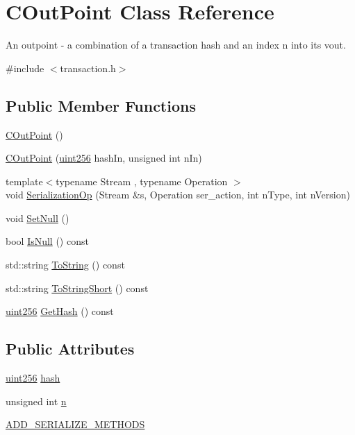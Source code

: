 \hypertarget{class_c_out_point}{}\section{C\+Out\+Point Class Reference}
\label{class_c_out_point}


An outpoint -\/ a combination of a transaction hash and an index n into its vout.  




{\ttfamily \#include $<$transaction.\+h$>$}

\subsection*{Public Member Functions}
\begin{DoxyCompactItemize}
\item 
\hyperlink{class_c_out_point_a4912217c2fe5e353d9f5546abb377e86}{C\+Out\+Point} ()
\item 
\hyperlink{class_c_out_point_a59286d6685530ba330943198e6f81812}{C\+Out\+Point} (\hyperlink{classuint256}{uint256} hash\+In, unsigned int n\+In)
\item 
{\footnotesize template$<$typename Stream , typename Operation $>$ }\\void \hyperlink{class_c_out_point_a171ccb3afa9bf9443a91e5ba3fdb911b}{Serialization\+Op} (Stream \&s, Operation ser\+\_\+action, int n\+Type, int n\+Version)
\item 
void \hyperlink{class_c_out_point_aa98ceceb3fc5f4d2c52033451ee8e251}{Set\+Null} ()
\item 
bool \hyperlink{class_c_out_point_acd3225f1bb5550af0b900cd0dd7112d9}{Is\+Null} () const 
\item 
std\+::string \hyperlink{class_c_out_point_afcfc33fde94fce212e99099c78162612}{To\+String} () const 
\item 
std\+::string \hyperlink{class_c_out_point_a2998c059602a32046dda180603fcfb65}{To\+String\+Short} () const 
\item 
\hyperlink{classuint256}{uint256} \hyperlink{class_c_out_point_ab63a99ac182d5174f568addf5db35162}{Get\+Hash} () const 
\end{DoxyCompactItemize}
\subsection*{Public Attributes}
\begin{DoxyCompactItemize}
\item 
\hyperlink{classuint256}{uint256} \hyperlink{class_c_out_point_af131c7194a660558b0ff158f4efa7a28}{hash}
\item 
unsigned int \hyperlink{class_c_out_point_a9fbc648ca0d11421ad66e897185a9b58}{n}
\item 
\hyperlink{class_c_out_point_ac025da4b121ed1bca9a4d88bcb9d3a90}{A\+D\+D\+\_\+\+S\+E\+R\+I\+A\+L\+I\+Z\+E\+\_\+\+M\+E\+T\+H\+O\+D\+S}
\end{DoxyCompactItemize}
